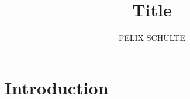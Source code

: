 \documentclass[12pt,letterpaper]{amsart}
\title{Title}
\author[]{FELIX SCHULTE}
\theoremstyle{definition}
\begin{document}
\maketitle

\section{Introduction}
	
\end{document}
